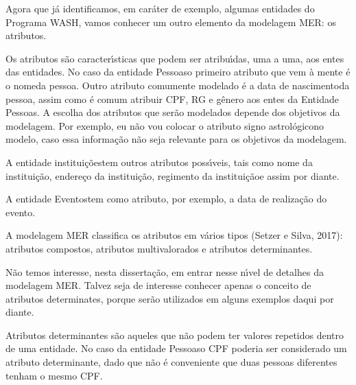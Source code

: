 \documentclass[
12pt,		%
openright,	%
twoside,  %
a4paper,			%
chapter=TITLE,		%
english,			%
french,				%
spanish,			%
brazil				%
]{USPSC-classe/USPSC}
\begin{document}
Agora que j\'a identificamos, em car\'ater de exemplo, algumas entidades do Programa WASH, vamos conhecer um outro elemento da modelagem MER: os atributos.




Os atributos s\~ao caracter\'{\i}sticas que podem ser atribu\'{\i}das, uma a uma, aos entes das entidades. No caso da entidade \textquotedbl Pessoas\textquotedbl  o primeiro atributo que vem \`a mente \'e o \textquotedbl nome\textquotedbl  da pessoa. Outro atributo comumente modelado \'e a \textquotedbl data de nascimento\textquotedbl  da pessoa, assim como \'e comum atribuir CPF, RG e g\^enero aos entes da Entidade \textquotedbl Pessoas\textquotedbl . A escolha dos atributos que ser\~ao modelados depende dos objetivos da modelagem. Por exemplo, eu n\~ao vou colocar o atributo \textquotedbl signo astrol\'ogico\textquotedbl  no modelo, caso essa informa\c{c}\~ao n\~ao seja relevante para os objetivos da modelagem.




A entidade \textquotedbl institui\c{c}\~oes\textquotedbl  tem outros atributos poss\'{\i}veis, tais como \textquotedbl nome da institui\c{c}\~ao\textquotedbl , \textquotedbl endere\c{c}o da institui\c{c}\~ao\textquotedbl , \textquotedbl regimento da institui\c{c}\~ao\textquotedbl  e assim por diante.




A entidade \textquotedbl Eventos\textquotedbl  tem como atributo, por exemplo, a data de realiza\c{c}\~ao do evento.




A modelagem MER classifica os atributos em v\'arios tipos (Setzer e Silva, 2017): atributos compostos, atributos multivalorados e atributos determinantes.




N\~ao temos interesse, nesta disserta\c{c}\~ao, em entrar nesse n\'{\i}vel de detalhes da modelagem MER. Talvez seja de interesse conhecer apenas o conceito de \textquotedbl atributos determinates\textquotedbl , porque ser\~ao utilizados em alguns exemplos daqui por diante.




Atributos determinantes s\~ao aqueles que n\~ao podem ter valores repetidos dentro de uma entidade. No caso da entidade \textquotedbl Pessoas\textquotedbl  o CPF poderia ser considerado um atributo determinante, dado que n\~ao \'e conveniente que duas pessoas diferentes tenham o mesmo CPF.
\end{document}
